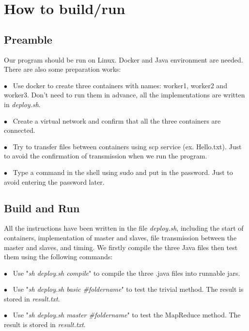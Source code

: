 \documentclass[a4paper,14pt,UTF8]{article}
\begin{document}
	\section{How to build/run}
	
	\subsection{Preamble}
	
	\quad Our program should be run on Linux. Docker and Java environment are needed. There are also some preparation works: 

	\begin{flushleft}
	
		$\bullet$ \ Use docker to create three containers with names: worker1, worker2 and worker3. Don't need to run them in advance, all the implementations are written in \textit{deploy.sh}. \par
		
		$\bullet$ \ Create a virtual network and confirm that all the three containers are connected. \par
		
		$\bullet$ \ Try to transfer files between containers using scp service (ex. Hello.txt). Just to avoid the confirmation of transmission when we run the program. \par
		
		$\bullet$ \ Type a command in the shell using sudo and put in the password. Just to avoid entering the password later. \par
	
	\end{flushleft}	
	
	\subsection{Build and Run}
		\quad All the instructions have been written in the file \textit{deploy.sh}, including the start of containers, implementation of master and slaves, file transmission between the master and slaves, and timing. We firstly compile the three Java files then test  them  using the following commands: 
	\begin{flushleft}
		
		$\bullet$ \ Use "\textit{sh deploy.sh compile}" to compile the three .java files into runnable jars. \par
		
		$\bullet$ \ Use "\textit{sh deploy.sh basic \#foldername}" to test the trivial method. The result is stored in \textit{result.txt}. \par

		$\bullet$ \ Use "\textit{sh deploy.sh master \#foldername}" to test the MapReduce method. The result is stored in \textit{result.txt}.\par

	\end{flushleft}
	
\end{document}
